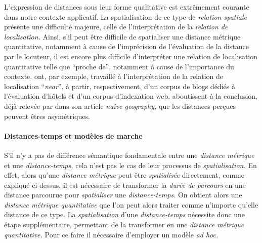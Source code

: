 L'expression de distances sous leur forme qualitative est extrêmement
courante dans notre contexte applicatif. La spatialisation de ce type
de \emph{relation spatiale} présente une difficulté majeure, celle de
l'interprétation de la \emph{relation de localisation.} Ainsi, s'il
peut être difficile de spatialiser une distance métrique quantitative,
notamment à cause de l'imprécision de l'évaluation de la distance par
le locuteur, il est encore plus difficile d’interpréter une relation
de localisation quantitative telle que \enquote{proche de}, notamment
à cause de l'importance du
contexte. \textcite{Wallgruen2014,Derungs2016} ont, par exemple,
travaillé à l'interprétation de la relation de localisation
\foreignquote{english}{\emph{near}}, à partir, respectivement, d'un
corpus de blogs dédiés à l'évaluation d'hôtels et d'un corpus
d'indexation web. \textcite{Wallgruen2014} aboutissent à la
conclusion, déjà relevée par \textcite{Egenhofer1995} dans son article
\emph{naive geography,} que les distances perçues peuvent êtres
asymétriques.

\paragraph{Distances-temps et modèles de marche}


S'il n'y a pas de différence sémantique fondamentale entre une
\emph{distance métrique} et une \emph{distance-temps,} cela n'est pas
le cas de leur processus de \emph{spatialisation.} En effet, alors
qu'une \emph{distance métrique} peut être \emph{spatialisée}
directement, comme expliqué ci-dessus, il est nécessaire de
transformer la \emph{durée de parcours} en une distance parcourue pour
\emph{spatialiser} une \emph{distance-temps.} On obtient alors une
\emph{distance métrique quantitative} que l'on peut alors traiter
comme n'importe qu'elle distance de ce type. La \emph{spatialisation}
d'une \emph{distance-temps} nécessite donc une étape supplémentaire,
permettant de la transformer en une \emph{distance métrique
  quantitative.} Pour ce faire il nécessaire d'employer un modèle
\emph{ad hoc.}

